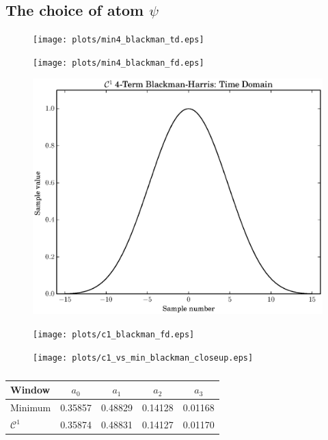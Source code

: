 \subsection{The choice of atom $\psi$ \label{sec:optblackman}}

\begin{figure}[!t]
    \caption{\label{plot:opt_blackman}}
    \centering
    \texttt{[image: plots/min4\_blackman\_td.eps]}
\end{figure}

\begin{figure}[!t]
    \caption{}
    \centering
    \texttt{[image: plots/min4\_blackman\_fd.eps]}
\end{figure}

\begin{figure}[!t]
    \caption{}
    \centering
    \includegraphics[width=\figwidthscale\textwidth]{plots/c1_blackman_td.eps}
\end{figure}

\begin{figure}[!t]
    \caption{}
    \centering
    \texttt{[image: plots/c1\_blackman\_fd.eps]}
\end{figure}

\begin{figure}[!t]
    \caption{\label{plot:c1vsminblackmancloseup}}
    \centering
    \texttt{[image: plots/c1\_vs\_min\_blackman\_closeup.eps]}
\end{figure}

\begin{table}
    \caption{\label{tab:optblackman}}
    \begin{center}
        \begin{tabular}{l c c c c }
            Window & $a_0$ & $a_1$ & $a_2$ & $a_3$ \\
            \hline
            Minimum & 0.35857 & 0.48829 & 0.14128 &
            0.01168 \\
            $\mathcal{C}^{1}$ & 0.35874 & 0.48831 &
            0.14127 & 0.01170
        \end{tabular}
    \end{center}
\end{table}

